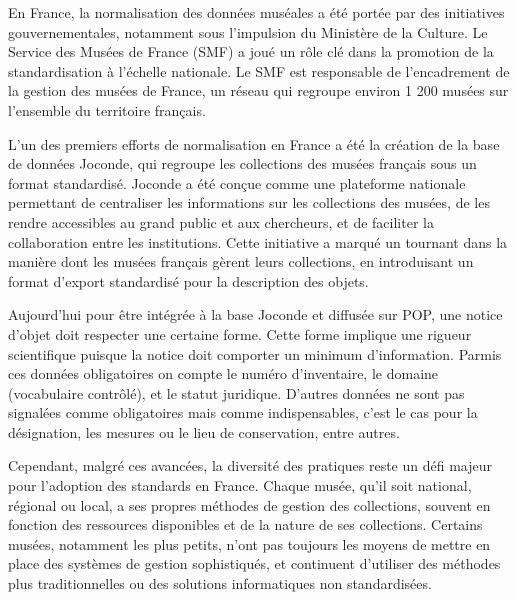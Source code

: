 En France, la normalisation des données muséales a été portée par des initiatives gouvernementales, notamment sous l’impulsion du Ministère de la Culture. Le Service des Musées de France (SMF) a joué un rôle clé dans la promotion de la standardisation à l’échelle nationale. Le SMF est responsable de l’encadrement de la gestion des musées de France, un réseau qui regroupe environ 1 200 musées sur l’ensemble du territoire français.\newline

L’un des premiers efforts de normalisation en France a été la création de la base de données Joconde, qui regroupe les collections des musées français sous un format standardisé. Joconde a été conçue comme une plateforme nationale permettant de centraliser les informations sur les collections des musées, de les rendre accessibles au grand public et aux chercheurs, et de faciliter la collaboration entre les institutions. Cette initiative a marqué un tournant dans la manière dont les musées français gèrent leurs collections, en introduisant un format d’export standardisé pour la description des objets. \newline

Aujourd’hui pour être intégrée à la base Joconde et diffusée sur POP, une notice d’objet doit respecter une certaine forme. Cette forme implique une rigueur scientifique puisque la notice doit comporter un minimum d’information. Parmis ces données obligatoires on compte le numéro d’inventaire, le domaine (vocabulaire contrôlé), et le statut juridique. D’autres données ne sont pas signalées comme obligatoires mais comme indispensables, c’est le cas pour la désignation, les mesures ou le lieu de conservation, entre autres.\newline

Cependant, malgré ces avancées, la diversité des pratiques reste un défi majeur pour l’adoption des standards en France. Chaque musée, qu’il soit national, régional ou local, a ses propres méthodes de gestion des collections, souvent en fonction des ressources disponibles et de la nature de ses collections. Certains musées, notamment les plus petits, n’ont pas toujours les moyens de mettre en place des systèmes de gestion sophistiqués, et continuent d’utiliser des méthodes plus traditionnelles ou des solutions informatiques non standardisées.\newline

